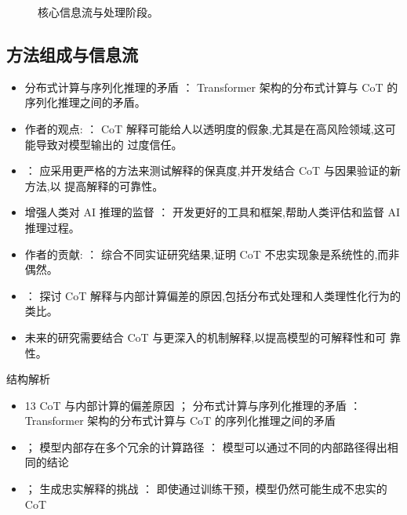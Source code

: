 \documentclass[UTF8,11pt,a4paper]{ctexart}
\begin{document}
\begin{figure}[H]
\centering
{}
\caption{核心信息流与处理阶段。}
\end{figure}

\subsection{方法组成与信息流}
\begin{itemize}
\item 分布式计算与序列化推理的矛盾 ： Transformer 架构的分布式计算与 CoT 的序列化推理之间的矛盾。
\item 作者的观点: ： CoT 解释可能给人以透明度的假象,尤其是在高风险领域,这可能导致对模型输出的 过度信任。
\item ： 应采用更严格的方法来测试解释的保真度,并开发结合 CoT 与因果验证的新方法,以 提高解释的可靠性。
\item 增强人类对 AI 推理的监督 ： 开发更好的工具和框架,帮助人类评估和监督 AI 推理过程。
\item 作者的贡献: ： 综合不同实证研究结果,证明 CoT 不忠实现象是系统性的,而非偶然。
\item ： 探讨 CoT 解释与内部计算偏差的原因,包括分布式处理和人类理性化行为的类比。
\item 未来的研究需要结合 CoT 与更深入的机制解释,以提高模型的可解释性和可 靠性。
\end{itemize}

\begin{keybox}{结构解析}
\begin{itemize}
\item 13 CoT 与内部计算的偏差原因 ； 分布式计算与序列化推理的矛盾 ： Transformer 架构的分布式计算与 CoT 的序列化推理之间的矛盾
\item ； 模型内部存在多个冗余的计算路径 ： 模型可以通过不同的内部路径得出相同的结论
\item ； 生成忠实解释的挑战 ： 即使通过训练干预，模型仍然可能生成不忠实的 CoT
\end{itemize}
\end{keybox}
\end{document}
